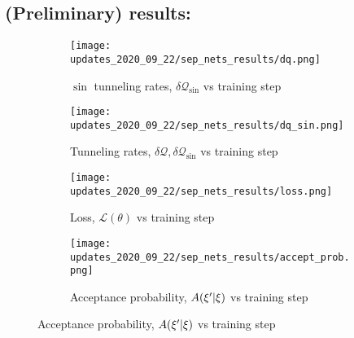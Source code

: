 %
\subsection{(Preliminary) results:}
%
\begin{figure}[htpb]
  \centering
  \begin{subfigure}[htpb]{0.78\textwidth}
    \texttt{[image: updates\_2020\_09\_22/sep\_nets\_results/dq.png]}
    \caption{\(\sin\) tunneling rates, \(\delta\mathcal{Q}_{\sin}\) vs training step}
  \end{subfigure}
  \vspace{0.5cm}
  \begin{subfigure}[htpb]{0.78\textwidth}
    \texttt{[image: updates\_2020\_09\_22/sep\_nets\_results/dq\_sin.png]}
    \caption{Tunneling rates, \(\delta \mathcal{Q}, \delta\mathcal{Q}_{\sin}\)
    vs training step}
  \end{subfigure}
  \vspace{0.5cm}
%
  \begin{subfigure}[htpb]{0.78\textwidth}
    \texttt{[image: updates\_2020\_09\_22/sep\_nets\_results/loss.png]}
    \caption{Loss, \(\mathcal{L}(\theta)\) vs training step} 
  \end{subfigure}
  \vspace{0.5cm}
%
  \begin{subfigure}[htpb]{0.78\textwidth}
    \texttt{[image: updates\_2020\_09\_22/sep\_nets\_results/accept\_prob.png]}
    \caption{Acceptance probability, \(A({\xi^{\prime}}|\xi)\) vs training step} 
  \end{subfigure}
\end{figure}
%
%
